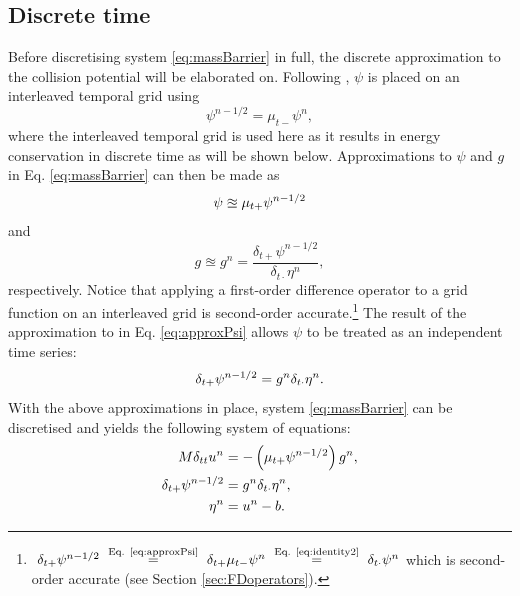 \subsection{Discrete time}
Before discretising system \eqref{eq:massBarrier} in full, the discrete approximation to the collision potential will be elaborated on.
Following \cite{Ducceschi2021}, $\psi$ is placed on an interleaved temporal grid using
\begin{equation}
    \psi^{n-1/2} = \mu_{t-}\psi^n,
\end{equation} 
where the interleaved temporal grid is used here as it results in energy conservation in discrete time as will be shown below. Approximations to $\psi$ and $g$ in Eq. \eqref{eq:massBarrier} can then be made as 
\begin{equation}
    \psi \approxeq \mu_{t+} \psi^{n-1/2}
\end{equation}
and 
\begin{equation}\label{eq:approxPsi}
    g \approxeq g^n = \frac{\delta_{t+}\psi^{n-1/2}}{\delta_{t\cdot}\eta^n} ,
\end{equation}
respectively. Notice that applying a first-order difference operator to a grid function on an interleaved grid is second-order accurate.\footnote{$\ \dtp \psi^{n-1/2}\ \overset{\text{Eq. \eqref{eq:approxPsi}}}{=}\ \dtp \mtm \psi^n\ \overset{\text{Eq. \eqref{eq:identity2}}}{=}\  \dtd \psi^n$ which is second-order accurate (see Section \ref{sec:FDoperators}).}
The result of the approximation to in Eq. \eqref{eq:approxPsi} allows $\psi$ to be treated as an independent time series:
\begin{equation}
    \delta_{t+} \psi^{n-1/2} = g^n \delta_{t\cdot} \eta^n.
\end{equation}
With the above approximations in place, system \eqref{eq:massBarrier} can be discretised and yields the following system of equations: 
\begin{subequations}\label{eq:massBarrierSystem}
    \begin{align}
        M\delta_{tt} u^n &= -\left(\mu_{t+}\psi^{n-1/2}\right)g^n,\label{eq:massBarrierSystem1}\\
        \delta_{t+} \psi^{n-1/2} &= g^n \delta_{t\cdot} \eta^n,\label{eq:massBarrierSystem2}\\ 
        \eta^n &= u^n - b.\label{eq:massBarrierSystem3}
    \end{align}
\end{subequations}


